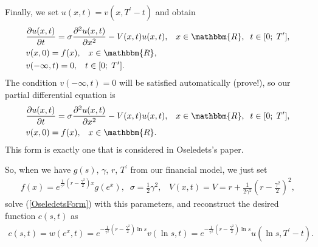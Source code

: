 \documentclass[11pt,a4paper]{extarticle}
\begin{document}
Finally, we set $u(x,t) = v(x, T^{\prime}-t)$ and obtain
\begin{equation}
	\begin{aligned}
		&\frac{\partial u(x,t)}{\partial t} = \sigma \frac{\partial^2 u(x,t)}{\partial x^2} - V(x,t) u(x,t),
		\;\;\;x \in \mathbbm{R},\;\; t \in [0;\;T^{\prime}],\\
		&v(x,0) = f(x), \;\;\; x \in \mathbbm{R},\\
		&v(-\infty,t) = 0, \;\;\; t \in [0;\;T^{\prime}].
	\end{aligned}
\end{equation}
The condition $v(-\infty,t) = 0$ will be satisfied automatically (prove!), so our partial differential equation is
\begin{equation}
	\begin{aligned}
		&\frac{\partial u(x,t)}{\partial t} = \sigma \frac{\partial^2 u(x,t)}{\partial x^2} - V(x,t) u(x,t),
		\;\;\;x \in \mathbbm{R},\;\; t \in [0;\;T^{\prime}],\\
		&v(x,0) = f(x), \;\;\; x \in \mathbbm{R}.
	\label{OseledetsForm}
	\end{aligned}
\end{equation}
This form is exactly one that is considered in Oseledets's paper.

So, when we have $g(s)$, $\gamma$, $r$, $T^{\prime}$ from our financial model, we just set
\begin{equation}
	\begin{aligned}
		f(x) = e^{\frac{1}{\gamma^2} (r-\frac{\gamma^2}{2})x} g(e^x), \;\; \sigma = \frac12 \gamma^2, \;\;\; V(x,t) = V = r +  \frac{1}{2\gamma^2} \left( r-\frac{\gamma^2}{2}\right)^2,
	\end{aligned}
\end{equation}
solve (\ref{OseledetsForm}) with this parameters, and reconstruct the desired function $c(s,t)$ as
\begin{equation}
	\begin{aligned}
		c(s,t) = w(e^x, t) = e^{-\frac{1}{\gamma^2} (r-\frac{\gamma^2}{2})\ln s} v(\ln s, t) = e^{-\frac{1}{\gamma^2} (r-\frac{\gamma^2}{2})\ln s} u(\ln s, T^{\prime} - t).
	\end{aligned}
\end{equation}

		
\end{document}
